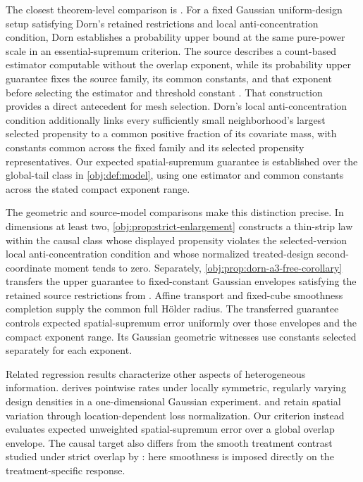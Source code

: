 \documentclass[11pt]{article}
\begin{document}
The closest theorem-level comparison is \citet[Assumptions 1--3 and Theorem 1(ii), p.~12]{Dorn2026GlobalOverlap}. For a fixed Gaussian uniform-design setup satisfying Dorn's retained restrictions and local anti-concentration condition, Dorn establishes a probability upper bound at the same pure-power scale in an essential-supremum criterion. The source describes a count-based estimator computable without the overlap exponent, while its probability upper guarantee fixes the source family, its common constants, and that exponent before selecting the estimator and threshold constant \citep[Lemmas 11 and 13, pp.~23--24; proof, pp.~27--28]{Dorn2026GlobalOverlap}. That construction provides a direct antecedent for mesh selection. Dorn's local anti-concentration condition additionally links every sufficiently small neighborhood's largest selected propensity to a common positive fraction of its covariate mass, with constants common across the fixed family and its selected propensity representatives. Our expected spatial-supremum guarantee is established over the global-tail class in \cref{obj:def:model}, using one estimator and common constants across the stated compact exponent range.

The geometric and source-model comparisons make this distinction precise. In dimensions at least two, \cref{obj:prop:strict-enlargement} constructs a thin-strip law within the causal class whose displayed propensity violates the selected-version local anti-concentration condition and whose normalized treated-design second-coordinate moment tends to zero. Separately, \cref{obj:prop:dorn-a3-free-corollary} transfers the upper guarantee to fixed-constant Gaussian envelopes satisfying the retained source restrictions from \citet[Section 2, Assumptions 1--2, pp.~3--7]{Dorn2026GlobalOverlap}. Affine transport and fixed-cube smoothness completion supply the common full Hölder radius. The transferred guarantee controls expected spatial-supremum error uniformly over those envelopes and the compact exponent range. Its Gaussian geometric witnesses use constants selected separately for each exponent.

Related regression results characterize other aspects of heterogeneous information. \citet[Assumption M and Theorem 1, pp.~3--4]{Gaiffas2005DegenerateRates} derives pointwise rates under locally symmetric, regularly varying design densities in a one-dimensional Gaussian experiment. \citet[Assumption D, equation (2.1), and Theorems 1--2]{gaiffas2009} and \citet[Sections 1 and 3]{schmidthieber2024} retain spatial variation through location-dependent loss normalization. Our criterion instead evaluates expected unweighted spatial-supremum error over a global overlap envelope. The causal target also differs from the smooth treatment contrast studied under strict overlap by \citet[Theorems 1--2 and Remark 11]{KennedyBalakrishnanRobinsWasserman2024}: here smoothness is imposed directly on the treatment-specific response.
\end{document}
